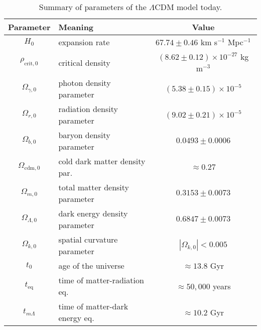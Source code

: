 \begin{table}
    \centering
    \begin{tabular}{|c|p{6cm}|c|}
    \hline
    \textbf{Parameter} & \textbf{Meaning} & \textbf{Value} \\ \hline \hline
    $H_0$ & \raggedright expansion rate & $67.74 \pm 0.46$ km s$^{-1}$ Mpc$^{-1}$ \\ 
    $\rho_{\text{crit},0}$ & \raggedright critical density & $(8.62 \pm 0.12) \times 10^{-27}$ kg m$^{-3}$ \\  \hline
    $\Omega_{\gamma,0}$ & \raggedright photon density parameter & $(5.38 \pm 0.15) \times 10^{-5}$ \\ 
    $\Omega_{r,0}$ & \raggedright radiation density parameter & $(9.02 \pm 0.21) \times 10^{-5}$ \\ 
    $\Omega_{b,0}$ & \raggedright baryon density parameter & $0.0493 \pm 0.0006$ \\
    $\Omega_{\text{cdm},0}$ & \raggedright cold dark matter density par. & $\approx 0.27$ \\ 
    $\Omega_{m,0}$ & \raggedright total matter density parameter & $0.3153 \pm 0.0073$ \\ 
    $\Omega_{\Lambda,0}$ & \raggedright dark energy density parameter & $0.6847 \pm 0.0073$ \\ 
    $\Omega_{k,0}$ & \raggedright spatial curvature parameter & $|\Omega_{k,0}| < 0.005$ \\ \hline 
    $t_0$ & \raggedright age of the universe & $\approx 13.8$ Gyr \\ 
    $t_\text{eq}$ & \raggedright time of matter-radiation eq. & $\approx 50,000$ years \\ 
    $t_{m\Lambda}$ & \raggedright time of matter-dark energy eq. & $\approx 10.2$ Gyr \\ \hline
    \end{tabular}
    \caption{Summary of parameters of the $\Lambda$CDM model today.}
    \label{tab:LambdaCDM}
\end{table}


